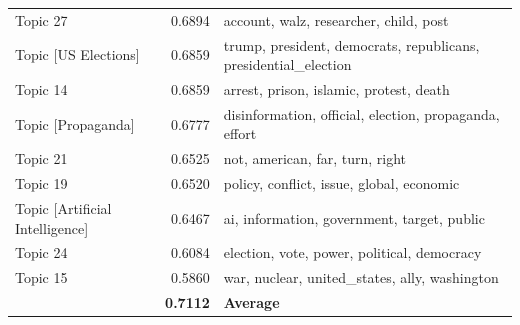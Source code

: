 \begin{table}
\begin{tabular}{lrp{9cm}}
Topic 27 & 0.6894 & account, walz, researcher, child, post \\
Topic [US Elections] & 0.6859 & trump, president, democrats, republicans, presidential\_election \\
Topic 14 & 0.6859 & arrest, prison, islamic, protest, death \\
Topic [Propaganda] & 0.6777 & disinformation, official, election, propaganda, effort \\
Topic 21 & 0.6525 & not, american, far, turn, right \\
Topic 19 & 0.6520 & policy, conflict, issue, global, economic \\
Topic [Artificial Intelligence] & 0.6467 & ai, information, government, target, public \\
Topic 24 & 0.6084 & election, vote, power, political, democracy \\
Topic 15 & 0.5860 & war, nuclear, united\_states, ally, washington \\
 & \textbf{0.7112} & \textbf{Average} \\
\bottomrule
\end{tabular}
\end{table}
